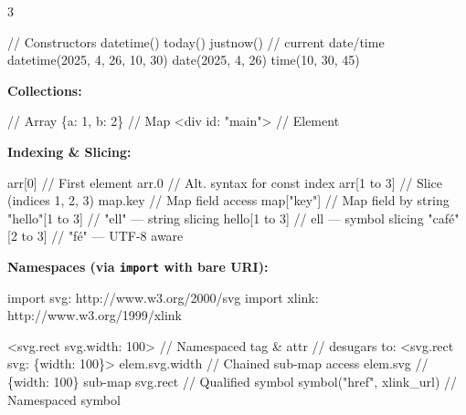 \documentclass[8pt,landscape,a4paper,oneside]{article}
\newenvironment{Shaded}{%
  \begin{snugshade}%
  \vspace{0.4\baselineskip}%
  \fontsize{9}{10}\selectfont%
  \setlength{\parskip}{0pt}%
  \setlength{\topsep}{0pt}%
  \setlength{\partopsep}{0pt}%
}{%
  \vspace{0.01\baselineskip}%
  \end{snugshade}%
}
\newcommand{\NormalTok}[1]{#1}
\begin{document}
\begin{multicols*}{3}
\begin{Shaded}
\begin{Highlighting}[]
\NormalTok{// Constructors}
\NormalTok{datetime()  today()  justnow()   // current date/time}
\NormalTok{datetime(2025, 4, 26, 10, 30)}
\NormalTok{date(2025, 4, 26)  time(10, 30, 45)}
\end{Highlighting}
\end{Shaded}

\textbf{Collections:}

\begin{Shaded}
\begin{Highlighting}[]
\NormalTok{[1, 2, 3]         // Array}
\NormalTok{\{a: 1, b: 2\}      // Map}
\NormalTok{\textless{}div id: "main"\textgreater{}  // Element}
\end{Highlighting}
\end{Shaded}

\textbf{Indexing \& Slicing:}

\begin{Shaded}
\begin{Highlighting}[]
\NormalTok{arr[0]            // First element}
\NormalTok{arr.0             // Alt. syntax for const index}
\NormalTok{arr[1 to 3]       // Slice (indices 1, 2, 3)}
\NormalTok{map.key           // Map field access}
\NormalTok{map["key"]        // Map field by string}
\NormalTok{"hello"[1 to 3]   // "ell" — string slicing}
\NormalTok{\textquotesingle{}hello\textquotesingle{}[1 to 3]   // \textquotesingle{}ell\textquotesingle{} — symbol slicing}
\NormalTok{"café"[2 to 3]    // "fé" — UTF{-}8 aware}
\end{Highlighting}
\end{Shaded}

\textbf{Namespaces (via \texttt{import} with bare URI):}

\begin{Shaded}
\begin{Highlighting}[]
\NormalTok{import svg: \textquotesingle{}http://www.w3.org/2000/svg\textquotesingle{}}
\NormalTok{import xlink: \textquotesingle{}http://www.w3.org/1999/xlink\textquotesingle{}}

\NormalTok{\textless{}svg.rect svg.width: 100\textgreater{}   // Namespaced tag \& attr}
\NormalTok{// desugars to: \textless{}svg.rect svg: \{width: 100\}\textgreater{}}
\NormalTok{elem.svg.width              // Chained sub{-}map access}
\NormalTok{elem.svg                    // \{width: 100\} sub{-}map}
\NormalTok{svg.rect                    // Qualified symbol}
\NormalTok{symbol("href", \textquotesingle{}xlink\_url\textquotesingle{}) // Namespaced symbol}
\end{Highlighting}
\end{Shaded}


\end{multicols*}
\end{document}

